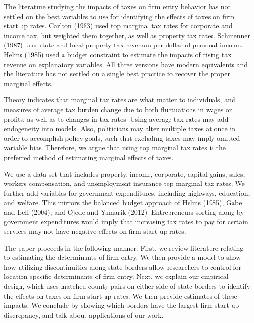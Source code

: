 The literature studying the impacts of taxes on firm entry behavior has not settled on the best variables to use for identifying the effects of taxes on firm start up rates. Carlton (1983) used top marginal tax rates for corporate and income tax, but weighted them together, as well as property tax rates. Schmenner (1987) uses state and local property tax revenues per dollar of personal income. Helms (1985) used a budget constraint to estimate the impacts of rising tax revenue on explanatory variables. All three versions have modern equivalents and the literature has not settled on a single best practice to recover the proper marginal effects.

Theory indicates that marginal tax rates are what matter to individuals, and measures of average tax burden change due to both fluctuations in wages or profits, as well as to changes in tax rates. Using average tax rates may add endogeneity into models. Also, politicians may alter multiple taxes at once in order to accomplish policy goals, such that excluding taxes may imply omitted variable bias. Therefore, we argue that using top marginal tax rates is the preferred method of estimating marginal effects of taxes.

We use a data set that includes property, income, corporate, capital gains, sales, workers compensation, and unemployment insurance top marginal tax rates. We further add variables for government expenditures, including highways, education, and welfare. This mirrors the balanced budget approach of Helms (1985), Gabe and Bell (2004), and  Ojede and Yamarik (2012). Entrepreneurs sorting along by government expenditures would imply that increasing tax rates to pay for certain services may not have negative effects on firm start up rates.

The paper proceeds in the following manner. First, we review literature relating to estimating the determinants of firm entry. We then provide a model to show how utilizing discontinuities along state borders allow researchers to control for location specific determinants of firm entry. Next, we explain our empirical design, which uses matched county pairs on either side of state borders to identify the effects on taxes on firm start up rates. We then provide estimates of these impacts. We conclude by showing which borders have the largest firm start up discrepancy, and talk about applications of our work.